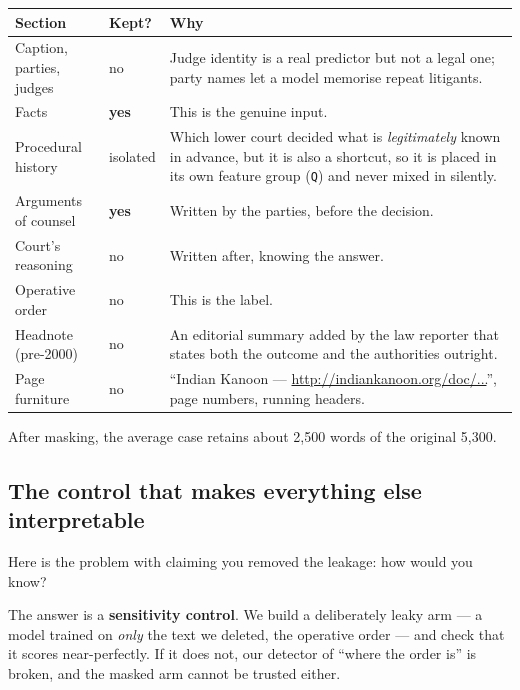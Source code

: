 \documentclass[12pt,a4paper]{article}
\newcommand{\code}[1]{\texttt{\small #1}}
\begin{document}
\begin{center}
\begin{tabular}{@{}llp{7.6cm}@{}}
\toprule
\textbf{Section} & \textbf{Kept?} & \textbf{Why} \\
\midrule
Caption, parties, judges  & no  & Judge identity is a real predictor but not a legal one; party
                                  names let a model memorise repeat litigants. \\
Facts                     & \textbf{yes} & This is the genuine input. \\
Procedural history        & isolated & Which lower court decided what is \emph{legitimately} known
                                  in advance, but it is also a shortcut, so it is placed in its own
                                  feature group (\code{Q}) and never mixed in silently. \\
Arguments of counsel      & \textbf{yes} & Written by the parties, before the decision. \\
Court's reasoning         & no  & Written after, knowing the answer. \\
Operative order           & no  & This is the label. \\
Headnote (pre-2000)       & no  & An editorial summary added by the law reporter that states both
                                  the outcome and the authorities outright. \\
Page furniture            & no  & ``Indian Kanoon --- \url{http://indiankanoon.org/doc/...}'',
                                  page numbers, running headers. \\
\bottomrule
\end{tabular}
\end{center}

After masking, the average case retains about 2,500 words of the original 5,300.

\subsection{The control that makes everything else interpretable}\label{sec:sensitivity}

Here is the problem with claiming you removed the leakage: how would you know?

The answer is a \textbf{sensitivity control}. We build a deliberately leaky arm --- a model trained
on \emph{only} the text we deleted, the operative order --- and check that it scores near-perfectly.
If it does not, our detector of ``where the order is'' is broken, and the masked arm cannot be
trusted either.
\end{document}
